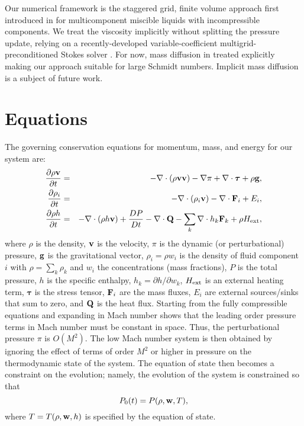 \documentclass[final]{siamltex}
\def\Fb {{\bf F}}
\def\gb {{\bf g}}
\def\Qb {{\bf Q}}
\def\vb {{\bf v}}
\def\wb {{\bf w}}
\def\taub   {\boldsymbol{\tau}}
\def\Hext {H_{\rm ext}}
\begin{document}
Our numerical framework is the staggered grid, finite volume approach first
introduced in \cite{LowMachExplicit,LowMachImplicit,LowMachMulti} for
multicomponent miscible liquids with incompressible components.
We treat the viscosity implicitly without splitting the pressure
update, relying on a recently-developed variable-coefficient multigrid-preconditioned
Stokes solver \cite{StokesPreconditioners}.
For now, mass diffusion in treated explicitly making our
approach suitable for large Schmidt numbers.  Implicit mass diffusion is a subject
of future work.

\section{Equations}
The governing conservation equations for momentum, mass, and energy for our system are:
\begin{eqnarray}
\frac{\partial\rho\vb}{\partial t} &=& - \nabla\cdot(\rho\vb\vb) - \nabla\pi + \nabla\cdot\taub + \rho\gb,\label{eq:momentum}\\
\frac{\partial\rho_i}{\partial t} &=& -\nabla\cdot(\rho_i\vb) - \nabla\cdot\Fb_i + E_i,\label{eq:mass}\\
\frac{\partial\rho h}{\partial t} &=& -\nabla\cdot(\rho h\vb) + \frac{DP}{Dt} - \nabla\cdot\Qb - \sum_k \nabla\cdot h_k \Fb_k + \rho\Hext,\label{eq:enthalpy}
\end{eqnarray}
where $\rho$ is the density, $\vb$ is the velocity, $\pi$ is the dynamic 
(or perturbational) pressure, $\gb$ is the gravitational vector, $\rho_i=\rho w_i$ is
the density of fluid component $i$ with $\rho = \sum_k\rho_k$ and $w_i$ the 
concentrations (mass fractions), $P$ is the total
pressure, $h$ is the specific enthalpy, $h_k = \partial h/\partial w_k$,
$\Hext$ is an external heating term, $\taub$ is the stress tensor,
$\Fb_i$ are the mass fluxes, $E_i$ are external sources/sinks that sum to zero,
and $\Qb$ is the heat flux.
Starting from the fully compressible equations and expanding in Mach number shows 
that the leading order pressure terms in Mach number must be constant in space. 
Thus, the perturbational pressure $\pi$ is $O(M^2)$.
The low Mach number system is then obtained by ignoring the effect of terms of 
order $M^2$ or higher in pressure  on the thermodynamic state of the system.
The equation of state then becomes a constraint on the evolution; namely,
the evolution of the system is constrained so that
\begin{equation}
P_0(t) = P(\rho,\wb,T),\label{eq:EOS}
\end{equation}
where $T=T(\rho,\wb,h)$ is specified by the equation of state.\\
\end{document}
